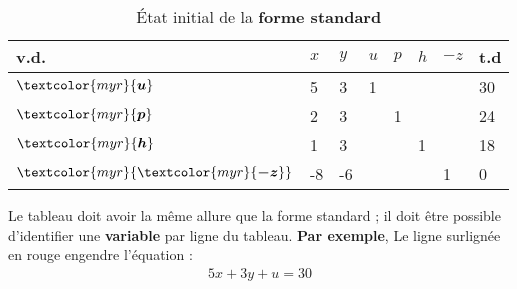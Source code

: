 \documentclass{report}
\begin{document}
\begin{multicols*}{2}
        \begin{table}[H]
                \begin{center}
                    \renewcommand{\arraystretch}{1.5}
                    \selectfont
                    \footnotesize
                        \begin{tabular}{|l|l l l l l |l|l|}
                        \arrayrulecolor{blue}
                        \hline
                        v.d. & $x$
                             & $y$ & $u$ & $p$ & $h$ & $-z$ & t.d 
                        \\
                        \hline
                        \arrayrulecolor{black}
                        \rowcolor{myg!40}
                        $\textcolor{myr}{\boldsymbol{u}}$     
                                & 5
                                & 3
                                & 1
                                & 
                                & &  &  30
                        \\
                        $\textcolor{myr}{\boldsymbol{p}}$     
                               & 2
                               & 3
                               & & 1
                               & & & 24 
                        \\
                        $\textcolor{myr}{\boldsymbol{h}}$     
                               & 1
                               & 3 
                               &  & 
                               &  1
                               & & 18 
                        \\ 
                        \hline
                        $\textcolor{myr}{\textcolor{myr}{\boldsymbol{-z}}}$ 
                                & -8
                                & -6
                                & 
                                & 
                                & 
                                & 1 & 0 
                        \\
                        \hline 



                        \end{tabular}
                \end{center}
                \caption{État initial de la \textbf{forme  standard}}
        \end{table}         
Le tableau doit avoir la même allure que la forme standard ; 
il doit être possible d'identifier une \textbf{variable} par 
ligne du tableau. \textbf{Par exemple}, Le ligne surlignée en rouge engendre  
l'équation : 
\begin{align*}
        5x  + 3y + u = 30
\end{align*}


\end{multicols*}
\end{document}
